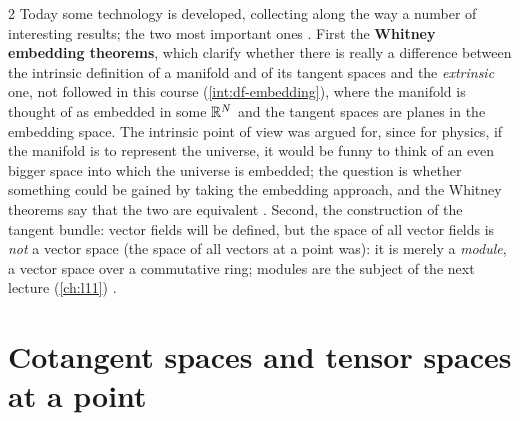 \begin{paracol}{2}
Today some technology is developed, collecting along the way a number of interesting results; the two most important ones . First the \textbf{Whitney embedding theorems}, which clarify whether there is really a difference between the intrinsic definition of a manifold and of its tangent spaces and the \emph{extrinsic} one, not
followed in this course (\cref{int:df-embedding}), where the manifold is thought of as embedded in some $\mathbb{R}^N$ and the tangent spaces are planes in the embedding space. The intrinsic point of view was argued for, since for physics, if the manifold is to represent the universe, it would be funny to think of an even bigger space into which the
universe is embedded; the question is whether something could be gained by taking the embedding approach, and the Whitney theorems say that the two are equivalent    .
Second, the construction of the tangent bundle: vector fields will be defined, but the space of all vector fields is \emph{not} a vector space (the space of all vectors at a point was): it is merely a \emph{module}, a vector space over a commutative ring; modules are the subject of the next lecture (\cref{ch:l11})   .

\section{Cotangent spaces and tensor spaces at a point}\label{sec:tb-cotangent}


\end{paracol}
